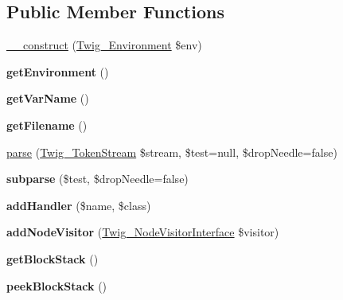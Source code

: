 \subsection*{Public Member Functions}
\begin{DoxyCompactItemize}
\item 
\hyperlink{class_twig___parser_a4f8326243132c1450a81e0a817aa1be7}{\+\_\+\+\_\+construct} (\hyperlink{class_twig___environment}{Twig\+\_\+\+Environment} \$env)
\item 
\hypertarget{class_twig___parser_a1a945689f9a90f9029d671ec32262d37}{}{\bfseries get\+Environment} ()\label{class_twig___parser_a1a945689f9a90f9029d671ec32262d37}

\item 
\hypertarget{class_twig___parser_a01f345a64ec10225d4205181cf82c811}{}{\bfseries get\+Var\+Name} ()\label{class_twig___parser_a01f345a64ec10225d4205181cf82c811}

\item 
\hypertarget{class_twig___parser_a2982abe8d7b767602a1485dfb4cf653d}{}{\bfseries get\+Filename} ()\label{class_twig___parser_a2982abe8d7b767602a1485dfb4cf653d}

\item 
\hyperlink{class_twig___parser_a69f32778987edc9c0e527586b0846016}{parse} (\hyperlink{class_twig___token_stream}{Twig\+\_\+\+Token\+Stream} \$stream, \$test=null, \$drop\+Needle=false)
\item 
\hypertarget{class_twig___parser_ab87dbe5da68b760af265a4fa8397d15a}{}{\bfseries subparse} (\$test, \$drop\+Needle=false)\label{class_twig___parser_ab87dbe5da68b760af265a4fa8397d15a}

\item 
\hypertarget{class_twig___parser_a29fdf9b89eff2e8dc95e5774067d9b35}{}{\bfseries add\+Handler} (\$name, \$class)\label{class_twig___parser_a29fdf9b89eff2e8dc95e5774067d9b35}

\item 
\hypertarget{class_twig___parser_adc294d7c409f47d2c26847601897c6db}{}{\bfseries add\+Node\+Visitor} (\hyperlink{interface_twig___node_visitor_interface}{Twig\+\_\+\+Node\+Visitor\+Interface} \$visitor)\label{class_twig___parser_adc294d7c409f47d2c26847601897c6db}

\item 
\hypertarget{class_twig___parser_a043c227e73dcf79ae5b24c586e48cbfc}{}{\bfseries get\+Block\+Stack} ()\label{class_twig___parser_a043c227e73dcf79ae5b24c586e48cbfc}

\item 
\hypertarget{class_twig___parser_ac478342b47a171d7f76ab0c860e8ccd5}{}{\bfseries peek\+Block\+Stack} ()\label{class_twig___parser_ac478342b47a171d7f76ab0c860e8ccd5}


\end{DoxyCompactItemize}
